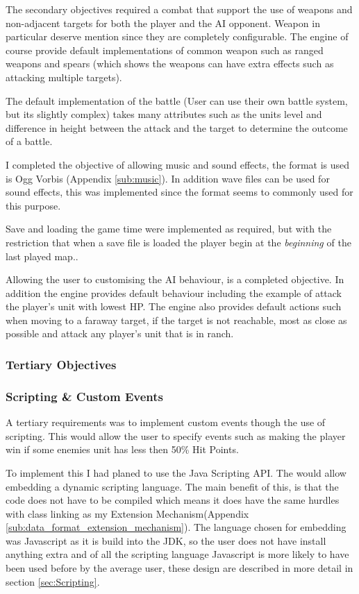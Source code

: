 The secondary objectives required a combat that support the use of weapons and non-adjacent targets for both the player and the AI opponent. Weapon in particular deserve  mention since they are completely configurable. The engine of course provide default implementations of common weapon such as ranged weapons and spears (which shows the weapons can have extra effects such as attacking multiple targets). 

The default implementation  of the battle (User can use their own battle system, but its slightly complex) takes many attributes such as the units level and difference in height between the attack and the target to determine the outcome of a battle. 

I completed the objective of allowing music and sound effects, the format is used is Ogg Vorbis (Appendix \ref{sub:music}). In addition wave files can be used for sound effects, this was implemented since the format seems to commonly used for this purpose.

Save and loading the game time were implemented as required, but with the restriction that when a save file is loaded the player begin at the \emph{beginning} of the last played map.. 

Allowing the user to customising the AI behaviour, is a completed objective. In addition the engine provides default behaviour including the example of attack the player's unit with lowest HP. The engine also provides default actions such when moving to a faraway target, if the target is not reachable, most as close as possible and attack any player's unit that is in ranch. 

\subsubsection{Tertiary Objectives}

\subsubsection{Scripting \& Custom Events}
A tertiary requirements was to implement custom events though the use of scripting.  This would allow the user to specify events such as making the player win if some enemies unit has less then 50\% Hit Points. 

To implement this I had planed to use the Java Scripting API\cite{javas}. The would allow embedding a dynamic scripting language.  The main benefit of this, is that the code does not have to be compiled which means it does have the same hurdles with class linking as my Extension Mechanism(Appendix \ref{sub:data_format_extension_mechanism}).   The language chosen for embedding was Javascript  as it is build into the JDK, so the user does not have install anything extra and of all the scripting language Javascript  is more likely to have been used before by the average user, these design are described in more detail in section \ref{sec:Scripting}. 

